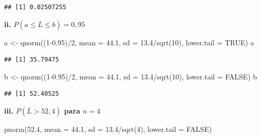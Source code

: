 \documentclass[
]{book}
\newenvironment{Shaded}{\begin{snugshade}}{\end{snugshade}}
\newcommand{\AttributeTok}[1]{\textcolor[rgb]{0.77,0.63,0.00}{#1}}
\newcommand{\ConstantTok}[1]{\textcolor[rgb]{0.00,0.00,0.00}{#1}}
\newcommand{\DecValTok}[1]{\textcolor[rgb]{0.00,0.00,0.81}{#1}}
\newcommand{\FloatTok}[1]{\textcolor[rgb]{0.00,0.00,0.81}{#1}}
\newcommand{\FunctionTok}[1]{\textcolor[rgb]{0.00,0.00,0.00}{#1}}
\newcommand{\NormalTok}[1]{#1}
\newcommand{\OtherTok}[1]{\textcolor[rgb]{0.56,0.35,0.01}{#1}}
\newcommand{\SpecialCharTok}[1]{\textcolor[rgb]{0.00,0.00,0.00}{#1}}
\begin{document}
\begin{verbatim}
## [1] 0.02507255
\end{verbatim}

\textbf{ii. \(P(a \le \overline{L} \le b) = 0,95\)}

\begin{Shaded}
\begin{Highlighting}[]
\NormalTok{a }\OtherTok{\textless{}{-}} \FunctionTok{qnorm}\NormalTok{((}\DecValTok{1}\FloatTok{{-}0.95}\NormalTok{)}\SpecialCharTok{/}\DecValTok{2}\NormalTok{, }
      \AttributeTok{mean =} \FloatTok{44.1}\NormalTok{, }
      \AttributeTok{sd =} \FloatTok{13.4}\SpecialCharTok{/}\FunctionTok{sqrt}\NormalTok{(}\DecValTok{10}\NormalTok{), }
      \AttributeTok{lower.tail =} \ConstantTok{TRUE}\NormalTok{)}
\NormalTok{a}
\end{Highlighting}
\end{Shaded}

\begin{verbatim}
## [1] 35.79475
\end{verbatim}

\begin{Shaded}
\begin{Highlighting}[]
\NormalTok{b }\OtherTok{\textless{}{-}} \FunctionTok{qnorm}\NormalTok{((}\DecValTok{1}\FloatTok{{-}0.95}\NormalTok{)}\SpecialCharTok{/}\DecValTok{2}\NormalTok{, }
      \AttributeTok{mean =} \FloatTok{44.1}\NormalTok{, }
      \AttributeTok{sd =} \FloatTok{13.4}\SpecialCharTok{/}\FunctionTok{sqrt}\NormalTok{(}\DecValTok{10}\NormalTok{), }
      \AttributeTok{lower.tail =} \ConstantTok{FALSE}\NormalTok{)}
\NormalTok{b}
\end{Highlighting}
\end{Shaded}

\begin{verbatim}
## [1] 52.40525
\end{verbatim}

\textbf{iii. \(P(\overline{L} > 52,4)\) para \(n = 4\)}

\begin{Shaded}
\begin{Highlighting}[]
\FunctionTok{pnorm}\NormalTok{(}\FloatTok{52.4}\NormalTok{, }
      \AttributeTok{mean =} \FloatTok{44.1}\NormalTok{, }
      \AttributeTok{sd =} \FloatTok{13.4}\SpecialCharTok{/}\FunctionTok{sqrt}\NormalTok{(}\DecValTok{4}\NormalTok{), }
      \AttributeTok{lower.tail =} \ConstantTok{FALSE}\NormalTok{)}
\end{Highlighting}
\end{Shaded}
\end{document}
